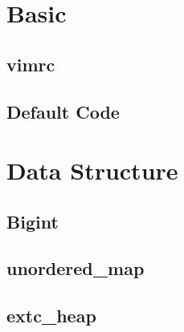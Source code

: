 \documentclass[a4paper,10pt,twocolumn,oneside]{article}
\begin{document}
\pagestyle{fancy}
\fancyfoot{}
\fancyhead[R]{\thepage}
\renewcommand{\headrulewidth}{0.4pt}
\renewcommand{\contentsname}{Contents} 

\scriptsize
\tableofcontents

\newpage

\section{Basic}
\subsection{vimrc}


%

\subsection{Default Code}


\section{Data Structure}
\subsection{Bigint}


% 

\subsection{unordered\_map}


\subsection{extc\_heap}

\end{document}
